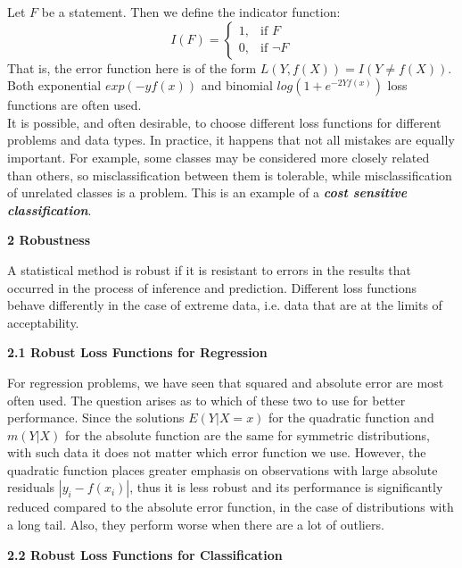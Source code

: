 \documentclass[12pt, letterpaper, twoside]{article}
\begin{document}
\hspace*{4ex} Let $F$ be a statement. Then we define the indicator function: \[
    I(F)=
\begin{cases}
    1,& \text{if } F\\
    0,& \text{if }   \neg F
\end{cases}
\]
That is, the error function here is of the form \(L(Y,f(X)) = I(Y \neq f(X)) \). Both exponential $exp(-yf(x))$ and binomial $log(1+e^{-2Yf(x)})$ loss functions are often used.\\
\hspace*{4ex} It is possible, and often desirable, to choose different loss functions for different problems and data types. In practice, it happens that not all mistakes are equally important. For example, some classes may be considered more closely related than others, so misclassification between them is tolerable, while misclassification of unrelated classes is a problem. This is an example of a \textbf{\textit{cost sensitive classification}}.
\pagebreak

\begin{center}
\textbf{\large{2 Robustness}} 
\end{center}
\hspace*{4ex} A statistical method is robust if it is resistant to errors in the results that occurred in the process of inference and prediction. Different loss functions behave differently in the case of extreme data, i.e. data that are at the limits of acceptability.\\
\begin{center}
\textbf{\large{2.1 Robust Loss Functions for Regression}}
\end{center}

\hspace*{4ex} For regression problems, we have seen that squared and absolute error are most often used. The question arises as to which of these two to use for better performance. Since the solutions $E(Y|X = x)$ for the quadratic function and $m(Y|X)$ for the absolute function are the same for symmetric distributions, with such data it does not matter which error function we use. However, the quadratic function places greater emphasis on observations with large absolute residuals $|y_i − f(x_i)|$, thus it is less robust and its performance is significantly reduced compared to the absolute error function, in the case of distributions with a long tail. Also, they perform worse when there are a lot of outliers.\\
\begin{center}
\textbf{\large{2.2 Robust Loss Functions for Classification}}
\end{center}
\end{document}
